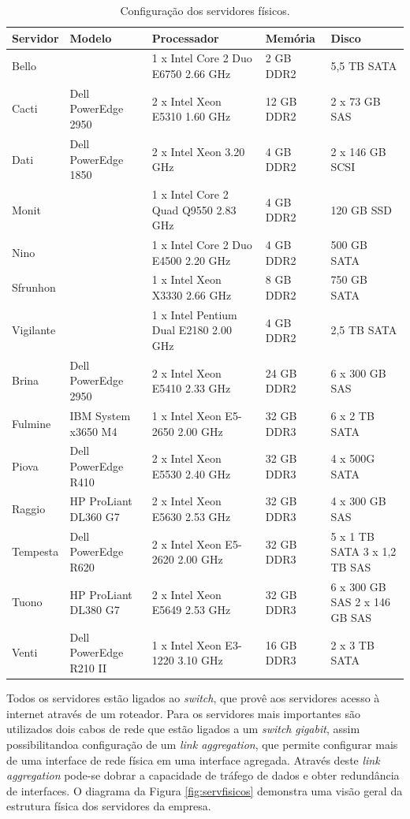 \begin{table}[h!]
\caption{Configuração dos servidores físicos.}
\label{tab:servfisicos}
\begin{center}
\def\arraystretch{1}
\setlength{\tabcolsep}{0.15cm}
\begin{tabular}{|l|l|p{5.1cm}|l|p{2.1cm}|}\hline
Servidor & Modelo & Processador & Memória & Disco\\\hline
Bello & & 1 x Intel Core 2 Duo E6750 2.66 GHz & 2 GB DDR2 & 5,5 TB SATA\\\hline
Cacti & Dell PowerEdge 2950 & 2 x Intel Xeon E5310 1.60 GHz & 12 GB DDR2 & 2 x 73 GB SAS\\\hline
Dati & Dell PowerEdge 1850 & 2 x Intel Xeon 3.20 GHz & 4 GB DDR2 & 2 x 146 GB SCSI\\\hline
Monit & & 1 x Intel Core 2 Quad Q9550 2.83 GHz & 4 GB DDR2 & 120 GB SSD\\\hline
Nino & & 1 x Intel Core 2 Duo E4500 2.20 GHz & 4 GB DDR2 & 500 GB SATA\\\hline
Sfrunhon & & 1 x Intel Xeon X3330 2.66 GHz & 8 GB DDR2 & 750 GB SATA\\\hline
Vigilante & & 1 x Intel Pentium Dual E2180 2.00 GHz & 4 GB DDR2 & 2,5 TB SATA\\\hline
Brina & Dell PowerEdge 2950 & 2 x Intel Xeon E5410 2.33 GHz & 24 GB DDR2 & 6 x 300 GB SAS\\\hline
Fulmine & IBM System x3650 M4 & 1 x Intel Xeon E5-2650 2.00 GHz & 32 GB DDR3 & 6 x 2 TB SATA\\\hline
Piova & Dell PowerEdge R410 & 2 x Intel Xeon E5530 2.40 GHz & 32 GB DDR3 & 4 x 500G SATA\\\hline
Raggio & HP ProLiant DL360 G7 & 2 x  Intel Xeon E5630 2.53 GHz & 32 GB DDR3 & 4 x 300 GB SAS\\\hline
Tempesta & Dell PowerEdge R620 & 2 x Intel Xeon E5-2620 2.00 GHz & 32 GB DDR3 & 5 x 1 TB SATA 3 x 1,2 TB SAS\\\hline
Tuono & HP ProLiant DL380 G7 & 2 x Intel Xeon E5649 2.53 GHz & 32 GB DDR3 & 6 x 300 GB SAS 2 x 146 GB SAS\\\hline
Venti & Dell PowerEdge R210 II & 1 x Intel Xeon E3-1220 3.10 GHz & 16 GB DDR3 & 2 x 3 TB SATA\\\hline
\end{tabular}
\end{center}
\end{table}

Todos os servidores estão ligados ao \textit{switch}, que provê aos servidores acesso à internet através de um roteador. Para os servidores 
mais importantes são utilizados dois cabos de rede que estão ligados a um \textit{switch} \textit{gigabit}, assim possibilitandoa configuração 
de um \textit{link aggregation}, que permite configurar mais de uma interface de rede física em uma interface agregada. Através deste 
\textit{link aggregation} pode-se dobrar a capacidade de tráfego de dados e obter redundância de interfaces. 
O diagrama da Figura \ref{fig:servfisicos} demonstra uma visão geral da estrutura física dos servidores da empresa. 

